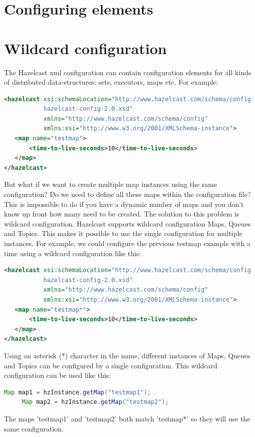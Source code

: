\section{Configuring elements}


\section{Wildcard configuration}
The Hazelcast xml configuration can contain configuration elements for all kinds of distributed data-structures: sets, executors, maps etc. For example:
\begin{lstlisting}[language=xml]
<hazelcast xsi:schemaLocation="http://www.hazelcast.com/schema/config
           hazelcast-config-2.0.xsd"
           xmlns="http://www.hazelcast.com/schema/config"
           xmlns:xsi="http://www.w3.org/2001/XMLSchema-instance">
   <map name="testmap">
       <time-to-live-seconds>10</time-to-live-seconds>
   </map>
</hazelcast>
\end{lstlisting}
But what if we want to create multiple map instances using the same configuration? Do we need to define all these maps within the configuration file? This is impossible to do if you have a dynamic number of maps and you don't know up front how many need to be created. The solution to this problem is wildcard configuration. Hazelcast supports wildcard configuration Maps, Queues and Topics. This makes it possible to use the single configuration for multiple instances. For example, we could configure the previous testmap example with a time using a wildcard configuration like this:
\begin{lstlisting}[language=xml]
<hazelcast xsi:schemaLocation="http://www.hazelcast.com/schema/config
           hazelcast-config-2.0.xsd"
           xmlns="http://www.hazelcast.com/schema/config"
           xmlns:xsi="http://www.w3.org/2001/XMLSchema-instance">
   <map name="testmap*">
       <time-to-live-seconds>10</time-to-live-seconds>
   </map>
</hazelcast>
\end{lstlisting}
Using an asterisk (*) character in the name, different instances of Maps, Queues and Topics can be configured by a single configuration. This wildcard configuration can be used like this:
\begin{lstlisting}[language=java]
     Map map1 = hzInstance.getMap("testmap1");
     Map map2 = hzInstance.getMap("testmap2");
\end{lstlisting}
The maps 'testmap1' and 'testmap2' both match 'testmap*' so they will use the same configuration.


